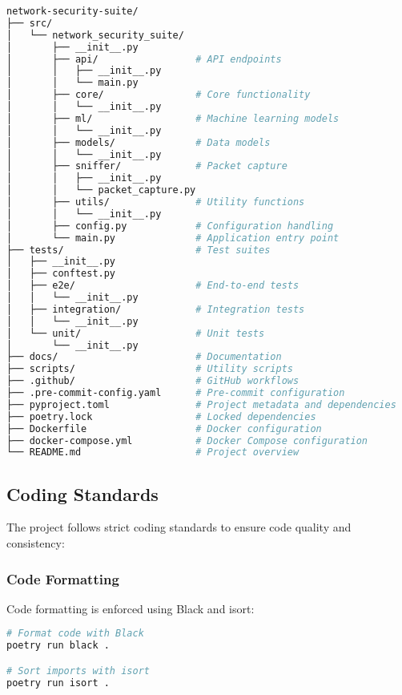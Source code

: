 \begin{lstlisting}[language=bash, caption=Project Structure]
network-security-suite/
├── src/
│   └── network_security_suite/
│       ├── __init__.py
│       ├── api/                 # API endpoints
│       │   ├── __init__.py
│       │   └── main.py
│       ├── core/                # Core functionality
│       │   └── __init__.py
│       ├── ml/                  # Machine learning models
│       │   └── __init__.py
│       ├── models/              # Data models
│       │   └── __init__.py
│       ├── sniffer/             # Packet capture
│       │   ├── __init__.py
│       │   └── packet_capture.py
│       ├── utils/               # Utility functions
│       │   └── __init__.py
│       ├── config.py            # Configuration handling
│       └── main.py              # Application entry point
├── tests/                       # Test suites
│   ├── __init__.py
│   ├── conftest.py
│   ├── e2e/                     # End-to-end tests
│   │   └── __init__.py
│   ├── integration/             # Integration tests
│   │   └── __init__.py
│   └── unit/                    # Unit tests
│       └── __init__.py
├── docs/                        # Documentation
├── scripts/                     # Utility scripts
├── .github/                     # GitHub workflows
├── .pre-commit-config.yaml      # Pre-commit configuration
├── pyproject.toml               # Project metadata and dependencies
├── poetry.lock                  # Locked dependencies
├── Dockerfile                   # Docker configuration
├── docker-compose.yml           # Docker Compose configuration
└── README.md                    # Project overview
\end{lstlisting}

\subsection{Coding Standards}
The project follows strict coding standards to ensure code quality and consistency:

\subsubsection{Code Formatting}
Code formatting is enforced using Black and isort:

\begin{lstlisting}[language=bash, caption=Code Formatting]
# Format code with Black
poetry run black .

# Sort imports with isort
poetry run isort .
\end{lstlisting}

